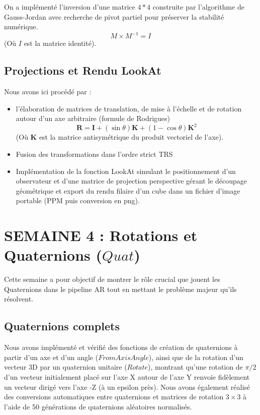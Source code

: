\documentclass[12pt,a4paper]{report}
\begin{document}
On a implémenté l'inversion d'une matrice $4*4$ construite par l'algorithme de Gauss-Jordan avec recherche de pivot partiel pour préserver la stabilité numérique.
 $$M \times M^{-1} = I$$ \quad (Où $I$ est la matrice identité).


\section{Projections et Rendu LookAt}

Nous avons ici procédé par :
\begin{itemize}
    \item l'élaboration de matrices de translation, de mise à l'échelle et de rotation autour d'un axe arbitraire (formule de Rodrigues)   $$\mathbf{R} = \mathbf{I} + (\sin \theta)\mathbf{K} + (1 - \cos \theta)\mathbf{K}^2$$  \quad (Où $\mathbf{K}$ est la matrice antisymétrique du produit vectoriel de l'axe).
    \item Fusion des transformations dans l'ordre strict TRS
    \item Implémentation de la fonction LookAt simulant le positionnement d'un observateur et d'une matrice de projection perspective gérant le découpage géométrique et export du rendu filaire d'un cube dans un fichier d'image portable (PPM puis conversion en png).
\end{itemize}



\chapter{SEMAINE 4 : Rotations et Quaternions ($Quat$)}

Cette semaine a pour objectif de montrer le rôle crucial que jouent les Quaternions dans le pipeline AR tout en mettant le problème majeur qu'ils résolvent.

\section{Quaternions complets}

Nous avons implémenté et vérifié des fonctions de création de quaternions à partir d'un axe et d'un angle ($FromAxisAngle$), ainsi que de la rotation d'un vecteur 3D par un quaternion unitaire ($Rotate$), montrant qu'une rotation de $\pi/2$ d'un vecteur initialement placé sur l'axe X autour de l'axe Y renvoie fidèlement un vecteur dirigé vers l'axe -Z (à un epsilon près). Nous avons également réalisé des conversions automatiques entre quaternions et matrices de rotation $3\times 3$ à l'aide de 50 générations de quaternions aléatoires normalisés.
\end{document}
